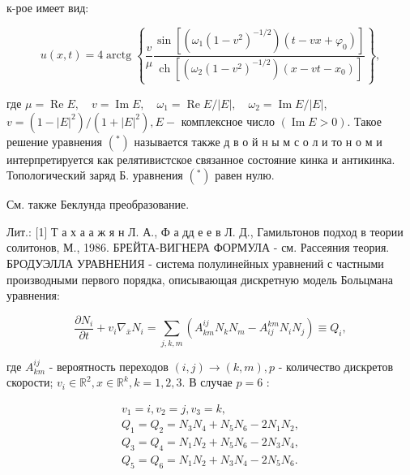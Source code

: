 \documentclass[10pt]{article}
\begin{document}
к-рое имеет вид:



\[

u(x, t)=4 \operatorname{arctg}\left\{\frac{v}{\mu} \frac{\sin \left[\left(\omega_{1}\left(1-v^{2}\right)^{-1 / 2}\right)\left(t-v x+\varphi_{0}\right)\right]}{\operatorname{ch}\left[\left(\omega_{2}\left(1-v^{2}\right)^{-1 / 2}\right)\left(x-v t-x_{0}\right)\right]}\right\},

\]



где $\mu=\operatorname{Re} E, \quad v=\operatorname{Im} E, \quad \omega_{1}=\operatorname{Re} E /|E|, \quad \omega_{2}=\operatorname{Im} E /|E|$, $v=\left(1-|E|^{2}\right) /\left(1+|E|^{2}\right), E-$ комплексное число $(\operatorname{Im} E>0)$. Такое решение уравнения $\left({ }^{*}\right)$ называется также д в о й н ы м с о л и то н о м и интерпретируется как релятивистское связанное состояние кинка и антикинка. Топологический заряд Б. уравнения $\left(^{*}\right)$ равен нулю.



См. также Беклунда преобразование.



Лит.: [1] Т а х а а ж я н Л. А., Ф а дд е е в Л. Д., Гамильтонов подход в теории солитонов, М., 1986. БРЕЙТА-ВИГНЕРА ФОРМУЛА - см. Рассеяния теория. БРОДУЭЛЛА УРАВНЕНИЯ - система полулинейных уравнений с частными производными первого порядка, описывающая дискретную модель Больцмана уравнения:



\[

\frac{\partial N_{i}}{\partial t}+v_{i} \nabla_{\bar{x}} N_{i}=\sum_{j, k, m}\left(A_{k m}^{i j} N_{k} N_{m}-A_{i j}^{k m} N_{i} N_{j}\right) \equiv Q_{i},

\]



где $A_{k m}^{i j}$ - вероятность переходов $(i, j) \rightarrow(k, m), p$ - количество дискретов скорости; $v_{i} \in \mathbb{R}^{2}, x \in \mathbb{R}^{k}, k=1,2,3$. В случае $p=6$ :



\[

\begin{gathered}

v_{1}=i, v_{2}=j, v_{3}=k, \\

Q_{1}=Q_{2}=N_{3} N_{4}+N_{5} N_{6}-2 N_{1} N_{2}, \\

Q_{3}=Q_{4}=N_{1} N_{2}+N_{5} N_{6}-2 N_{3} N_{4}, \\

Q_{5}=Q_{6}=N_{1} N_{2}+N_{3} N_{4}-2 N_{5} N_{6} .

\end{gathered}

\]
\end{document}
